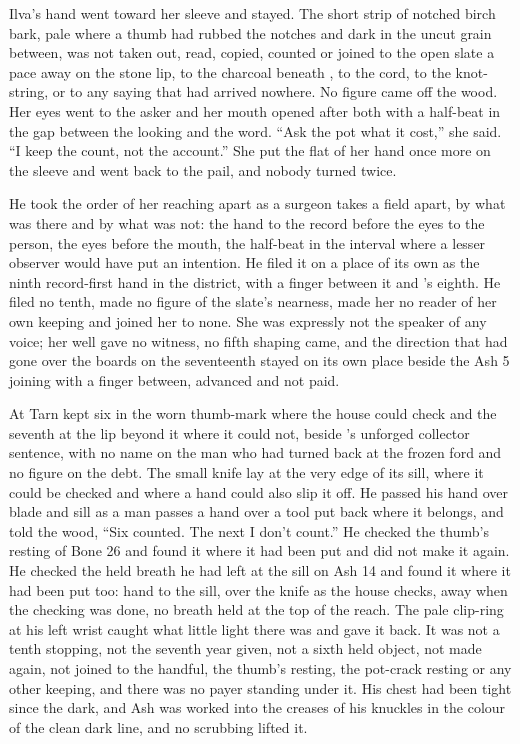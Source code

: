 Ilva’s hand went toward her sleeve and stayed. The short strip of notched birch bark, pale where a thumb had rubbed the notches and dark in the uncut grain between, was not taken out, read, copied, counted or joined to the open slate a pace away on the stone lip, to the charcoal beneath , to the cord, to the knot-string, or to any saying that had arrived nowhere. No figure came off the wood. Her eyes went to the asker and her mouth opened after both with a half-beat in the gap between the looking and the word. “Ask the pot what it cost,” she said. “I keep the count, not the account.” She put the flat of her hand once more on the sleeve and went back to the pail, and nobody turned twice.

He took the order of her reaching apart as a surgeon takes a field apart, by what was there and by what was not: the hand to the record before the eyes to the person, the eyes before the mouth, the half-beat in the interval where a lesser observer would have put an intention. He filed it on a place of its own as the ninth record-first hand in the district, with a finger between it and ’s eighth. He filed no tenth, made no figure of the slate’s nearness, made her no reader of her own keeping and joined her to none. She was expressly not the speaker of any voice; her well gave no witness, no fifth shaping came, and the direction that had gone over the boards on the seventeenth stayed on its own place beside the Ash 5 joining with a finger between, advanced and not paid.

\scenebreak

At  Tarn kept six in the worn thumb-mark where the house could check and the seventh at the lip beyond it where it could not, beside ’s unforged collector sentence, with no name on the man who had turned back at the frozen ford and no figure on the debt. The small knife lay at the very edge of its sill, where it could be checked and where a hand could also slip it off. He passed his hand over blade and sill as a man passes a hand over a tool put back where it belongs, and told the wood, “Six counted. The next I don’t count.” He checked the thumb’s resting of Bone 26 and found it where it had been put and did not make it again. He checked the held breath he had left at the sill on Ash 14 and found it where it had been put too: hand to the sill, over the knife as the house checks, away when the checking was done, no breath held at the top of the reach. The pale clip-ring at his left wrist caught what little light there was and gave it back. It was not a tenth stopping, not the seventh year given, not a sixth held object, not made again, not joined to the handful, the thumb’s resting, the pot-crack resting or any other keeping, and there was no payer standing under it. His chest had been tight since the dark, and Ash was worked into the creases of his knuckles in the colour of the clean dark line, and no scrubbing lifted it.

